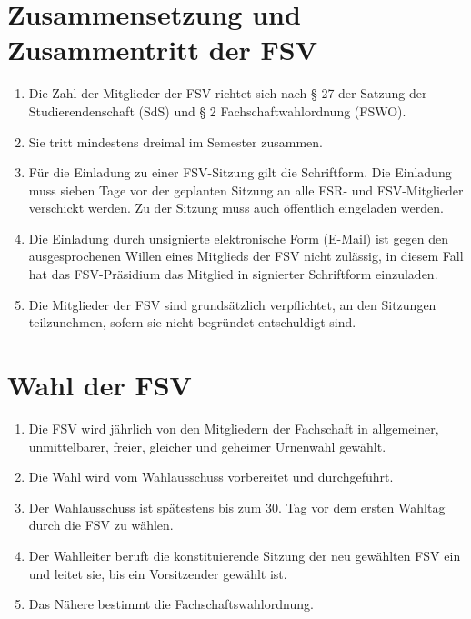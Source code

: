 \documentclass{article}
\begin{document}
\section{Zusammensetzung und Zusammentritt der FSV}
\begin{enumerate}[(1)]
\item Die Zahl der Mitglieder der FSV richtet sich nach § 27 der Satzung der Studierendenschaft (SdS) und § 2 Fachschaftwahlordnung (FSWO).
\item Sie tritt mindestens dreimal im Semester zusammen.
\item Für die Einladung zu einer FSV-Sitzung gilt die Schriftform. Die Einladung muss sieben Tage vor der geplanten Sitzung an alle FSR- und FSV-Mitglieder verschickt werden. Zu der Sitzung muss auch öffentlich eingeladen werden.
\item Die Einladung durch unsignierte elektronische Form (E-Mail) ist gegen den ausgesprochenen Willen eines Mitglieds der FSV nicht zulässig, in diesem Fall hat das FSV-Präsidium das Mitglied in signierter Schriftform einzuladen.
\item Die Mitglieder der FSV sind grundsätzlich verpflichtet, an den Sitzungen teilzunehmen, sofern sie nicht begründet entschuldigt sind.
\end{enumerate}

\section{Wahl der FSV}
\begin{enumerate}[(1)]
    \item Die FSV wird jährlich von den Mitgliedern der Fachschaft in allgemeiner, unmittelbarer, freier, gleicher und geheimer Urnenwahl gewählt.
    \item Die Wahl wird vom Wahlausschuss vorbereitet und durchgeführt.
    \item Der Wahlausschuss ist spätestens bis zum 30. Tag vor dem ersten Wahltag durch die FSV zu wählen.
    \item Der Wahlleiter beruft die konstituierende Sitzung der neu gewählten FSV ein und leitet sie, bis ein Vorsitzender gewählt ist.
	\item Das Nähere bestimmt die Fachschaftswahlordnung.
\end{enumerate}
\end{document}
